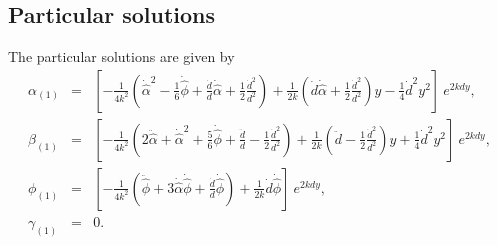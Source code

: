 \documentclass[a4paper,11pt]{article}
\begin{document}
\subsection{Particular solutions} 

The particular solutions are given by 
\begin{eqnarray}
\alpha_{(1)} &=& \left[
-\frac{1}{4k^2} \left(
 \dot{\hat{\alpha}}^2
 -\frac{1}{6}\dot{\hat{\phi}}
 +\frac{\dot{d}}{d}\dot{\hat{\alpha}}
 +\frac{1}{2}\frac{\dot{d}^2}{d^2} \right)
+\frac{1}{2k}
          \left(\dot{d}\dot{\hat{\alpha}}
                 +\frac{1}{2}\frac{\dot{d}^2}{d^2} \right) y 
-\frac{1}{4}\dot{d}^2 y^2 \right]
\ e^{2 k d y},  \\ 
\beta_{(1)} &=& \left[
-\frac{1}{4k^2} 
\left(
  2\ddot{\hat{\alpha}}
 +\dot{\hat{\alpha}}^2
 +\frac{5}{6}\dot{\hat{\phi}}
 +\frac{\ddot{d}}{d}
 -\frac{1}{2}\frac{\dot{d}^2}{d^2} \right) 
+\frac{1}{2k}
          \left(\ddot{d}
                 -\frac{1}{2}\frac{\dot{d}^2}{d^2} \right) y  
+\frac{1}{4}\dot{d}^2 y^2
\right]
\ e^{2 k d y}, \\ 
\phi_{(1)} &=& \left[
-\frac{1}{4k^2}
\left(
\ddot{\hat{\phi}}
+3\dot{\hat{\alpha}}\dot{\hat{\phi}}
+\frac{\dot{d}}{d}\dot{\hat{\phi}}
\right)
+\frac{1}{2k}\dot{d}\dot{\hat{\phi}}
\right]
\ e^{2 k d y}, \\ 
\gamma_{(1)} &=& 0. 
\end{eqnarray}
\end{document}
